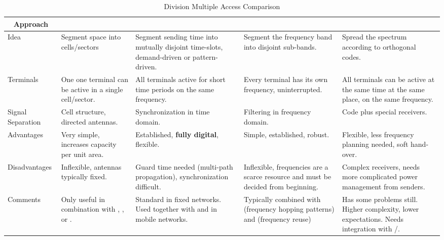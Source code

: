 \begin{table}[h!]
  \centering
  \begin{tabular}{p{2cm}|p{3.6cm}p{3.6cm}p{3.6cm}p{3.6cm}}
    \toprule
    \multicolumn{1}{c|}{\textbf{Approach}} & \multicolumn{1}{c}{\textbf{\nameref{subsubsec:SDMA}}} & \multicolumn{1}{c}{\textbf{\nameref{subsubsec:TDMA}}} & \multicolumn{1}{c}{\textbf{\nameref{subsubsec:FDMA}}} & \multicolumn{1}{c}{\textbf{\nameref{subsubsec:CDMA}}} \\
    \midrule
    Idea & Segment space into cells/sectors & Segment sending time into mutually disjoint time-slots, demand-driven or pattern-driven. & Segment the frequency band into disjoint sub-bands. & Spread the spectrum according to orthogonal codes. \\ \midrule
    Terminals & One one terminal can be active in a single cell/sector. & All terminals active for short time periods on the same frequency. & Every terminal has its own frequency, uninterrupted. & All terminals can be active at the same time at the same place, on the same frequency. \\ \midrule
    Signal Separation & Cell structure, directed antennas. & Synchronization in time domain. & Filtering in frequency domain. & Code plus special receivers. \\ \midrule
    Advantages & Very simple, increases capacity per unit area. & Established, \textbf{fully digital}, flexible. & Simple, established, robust. & Flexible, less frequency planning needed, soft hand-over. \\ \midrule
    Disadvantages & Inflexible, antennas typically fixed. & Guard time needed (multi-path propagation), synchronization difficult. & Inflexible, frequencies are a scarce resource and must be decided from beginning. & Complex receivers, needs more complicated power management from senders. \\ \midrule
    Comments & Only useful in combination with \nameref{subsubsec:TDMA}, \nameref{subsubsec:FDMA}, or \nameref{subsubsec:CDMA}. & Standard in fixed networks. Used together with \nameref{subsubsec:FDMA} and \nameref{subsubsec:SDMA} in mobile networks. & Typically combined with \nameref{subsubsec:TDMA} (frequency hopping patterns) and \nameref{subsubsec:SDMA} (frequency reuse) & Has some problems still. Higher complexity, lower expectations. Needs integration with \nameref{subsubsec:TDMA}/\nameref{subsubsec:FDMA}. \\
    \bottomrule
  \end{tabular}
  \caption{Division Multiple Access Comparison}
  \label{tab:DMA_Comparison}
\end{table}

